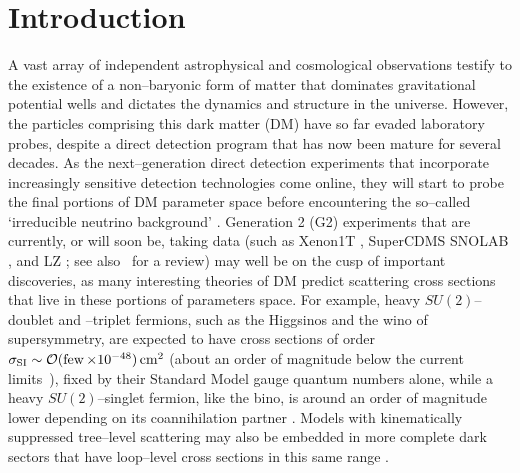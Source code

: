 \documentclass[11pt, a4paper]{article}
\newcommand{\tenx}[1]{\times 10^{#1}}
\begin{document}
\section{Introduction} \setcounter{page}{2}


A vast array of independent astrophysical and cosmological observations testify to the existence of a non--baryonic form of matter that dominates gravitational potential wells and dictates the dynamics and structure in the universe. However, the particles comprising this dark matter (DM) have so far evaded laboratory probes, despite a direct detection program that has now been mature for several decades. As the next--generation direct detection experiments that incorporate increasingly sensitive detection technologies come online, they will start to probe the final portions of DM parameter space before encountering the so--called `irreducible neutrino background' \cite{Bauer:2013ihz,Aprile:2015uzo,Agnese:2016cpb,Malling:2011va,Newstead:2013pea,Cushman:2013zza,Billard:2013qya,Ruppin:2014bra,Davis:2014ama,Dent:2016iht}. Generation 2 (G2) experiments that are currently, or will soon be, taking data (such as Xenon1T \cite{Aprile:2015uzo}, SuperCDMS SNOLAB \cite{Agnese:2016cpb}, and LZ \cite{Malling:2011va}; see also~\cite{Bauer:2013ihz} for a review) may well be on the cusp of important discoveries, as many interesting theories of DM predict scattering cross sections that live in these portions of parameters space. For example, heavy $SU(2)$--doublet and --triplet fermions, such as the Higgsinos and the wino of supersymmetry, are expected to have cross sections of order $\sigma_{\rm SI} \sim \cO(\few\tenx{-48})\cm^2$ \cite{Hill:2011be,Hill:2013hoa,Hill:2014yxa} (about an order of magnitude below the current limits~\cite{Akerib:2016vxi,Tan:2016zwf}), fixed by their Standard Model gauge quantum numbers alone, while a heavy $SU(2)$--singlet fermion, like the bino, is around an order of magnitude lower depending on its coannihilation partner \cite{Berlin:2015njh}. Models with kinematically suppressed tree--level scattering may also be embedded in more complete dark sectors that have loop--level cross sections in this same range \cite{Ipek:2014gua,McDermott:2014rqa,Appelquist:2015yfa,Appelquist:2015zfa}.
\end{document}
